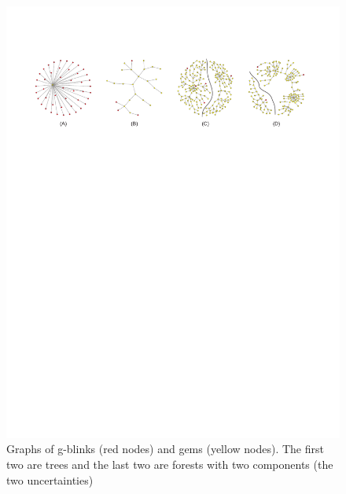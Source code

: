 \begin{figure}[htp]
   \begin{center}
      \leavevmode
      \includegraphics[width=15cm]{fig/subgraphs.pdf}
   \end{center}
   \vspace{-0.7cm}
   \caption{Graphs of g-blinks (red nodes) and gems (yellow nodes). The first two are trees
   and the last two are forests with two components (the two uncertainties)}
   \label{fig:subgraphs}
\end{figure}


